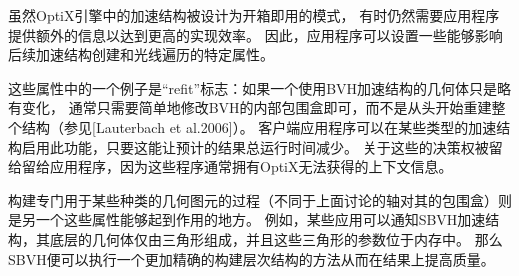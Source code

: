 虽然OptiX引擎中的加速结构被设计为开箱即用的模式，
有时仍然需要应用程序提供额外的信息以达到更高的实现效率。
因此，应用程序可以设置一些能够影响后续加速结构创建和光线遍历的特定属性。

这些属性中的一个例子是“refit”标志：如果一个使用BVH加速结构的几何体只是略有变化，
通常只需要简单地修改BVH的内部包围盒即可，而不是从头开始重建整个结构（参见[Lauterbach et al.2006]）。
客户端应用程序可以在某些类型的加速结构启用此功能，只要这能让预计的结果总运行时间减少。
关于这些的决策权被留给留给应用程序，因为这些程序通常拥有OptiX无法获得的上下文信息。

构建专门用于某些种类的几何图元的过程（不同于上面讨论的轴对其的包围盒）则是另一个这些属性能够起到作用的地方。
例如，某些应用可以通知SBVH加速结构，其底层的几何体仅由三角形组成，并且这些三角形的参数位于内存中。
那么SBVH便可以执行一个更加精确的构建层次结构的方法从而在结果上提高质量。